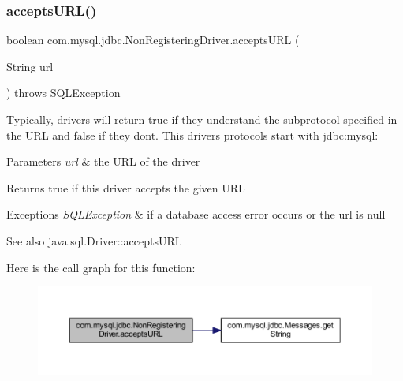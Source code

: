 \subsubsection{\texorpdfstring{accepts\+U\+R\+L()}{acceptsURL()}}
{\footnotesize\ttfamily boolean com.\+mysql.\+jdbc.\+Non\+Registering\+Driver.\+accepts\+U\+RL (\begin{DoxyParamCaption}\item[{String}]{url }\end{DoxyParamCaption}) throws S\+Q\+L\+Exception}

Typically, drivers will return true if they understand the subprotocol specified in the U\+RL and false if they don\textquotesingle{}t. This driver\textquotesingle{}s protocols start with jdbc\+:mysql\+:


\begin{DoxyParams}{Parameters}
{\em url} & the U\+RL of the driver\\
\hline
\end{DoxyParams}
\begin{DoxyReturn}{Returns}
true if this driver accepts the given U\+RL
\end{DoxyReturn}

\begin{DoxyExceptions}{Exceptions}
{\em S\+Q\+L\+Exception} & if a database access error occurs or the url is null\\
\hline
\end{DoxyExceptions}
\begin{DoxySeeAlso}{See also}
java.\+sql.\+Driver\+::accepts\+U\+RL 
\end{DoxySeeAlso}
Here is the call graph for this function\+:
\nopagebreak
\begin{figure}[H]
\begin{center}
\leavevmode
\includegraphics[width=350pt]{classcom_1_1mysql_1_1jdbc_1_1_non_registering_driver_abe7a0b5bf395ae24c4346d6bab87a0be_cgraph}
\end{center}
\end{figure}
\mbox{\label{classcom_1_1mysql_1_1jdbc_1_1_non_registering_driver_a834c012e752a01d1ee435b3461bb8218}} 
